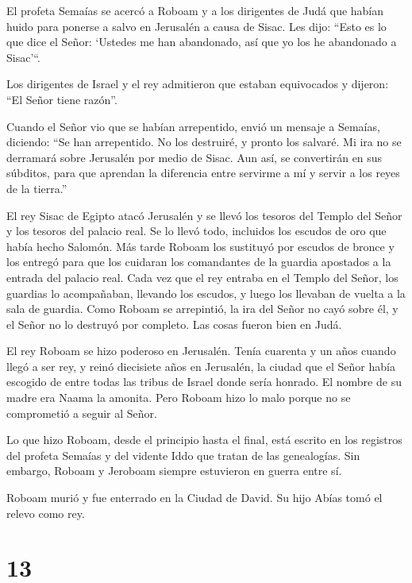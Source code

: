  El profeta Semaías se acercó a Roboam y a los dirigentes de
Judá que habían huido para ponerse a salvo en Jerusalén a causa de
Sisac. Les dijo: ``Esto es lo que dice el Señor: `Ustedes me han
abandonado, así que yo los he abandonado a Sisac'``.

 Los dirigentes de Israel y el rey admitieron que estaban
equivocados y dijeron: ``El Señor tiene razón''.

 Cuando el Señor vio que se habían arrepentido, envió un
mensaje a Semaías, diciendo: ``Se han arrepentido. No los destruiré, y
pronto los salvaré. Mi ira no se derramará sobre Jerusalén por medio de
Sisac.  Aun así, se convertirán en sus súbditos, para que
aprendan la diferencia entre servirme a mí y servir a los reyes de la
tierra.''

 El rey Sisac de Egipto atacó Jerusalén y se llevó los
tesoros del Templo del Señor y los tesoros del palacio real. Se lo llevó
todo, incluidos los escudos de oro que había hecho Salomón.
 Más tarde Roboam los sustituyó por escudos de bronce y los
entregó para que los cuidaran los comandantes de la guardia apostados a
la entrada del palacio real.  Cada vez que el rey entraba
en el Templo del Señor, los guardias lo acompañaban, llevando los
escudos, y luego los llevaban de vuelta a la sala de guardia.
 Como Roboam se arrepintió, la ira del Señor no cayó sobre
él, y el Señor no lo destruyó por completo. Las cosas fueron bien en
Judá.

 El rey Roboam se hizo poderoso en Jerusalén. Tenía
cuarenta y un años cuando llegó a ser rey, y reinó diecisiete años en
Jerusalén, la ciudad que el Señor había escogido de entre todas las
tribus de Israel donde sería honrado. El nombre de su madre era Naama la
amonita.  Pero Roboam hizo lo malo porque no se comprometió
a seguir al Señor.

 Lo que hizo Roboam, desde el principio hasta el final,
está escrito en los registros del profeta Semaías y del vidente Iddo que
tratan de las genealogías. Sin embargo, Roboam y Jeroboam siempre
estuvieron en guerra entre sí.

 Roboam murió y fue enterrado en la Ciudad de David. Su
hijo Abías tomó el relevo como rey.

\hypertarget{section-12}{%
\section{13}\label{section-12}}


